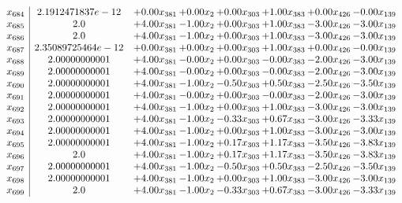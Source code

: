 \documentclass[8pt]{article}
\begin{document}
\[\begin{array}{c| c c@{\hskip 2pt} c@{\hskip 2pt} c@{\hskip 2pt} c@{\hskip 2pt} c@{\hskip 2pt} c@{\hskip 2pt} }
 x_{684}   &  2.1912471837e-12 & +  0.00 x_{381} & +  0.00 x_{2} & +  0.00 x_{303} & +  1.00 x_{383} & +  0.00 x_{426} & -0.00 x_{139}\\
 x_{685}   &  2.0 & +  4.00 x_{381} & -1.00 x_{2} & +  0.00 x_{303} & +  1.00 x_{383} & -3.00 x_{426} & -3.00 x_{139}\\
 x_{686}   &  2.0 & +  4.00 x_{381} & -1.00 x_{2} & +  0.00 x_{303} & +  1.00 x_{383} & -3.00 x_{426} & -3.00 x_{139}\\
 x_{687}   &  2.35089725464e-12 & +  0.00 x_{381} & +  0.00 x_{2} & +  0.00 x_{303} & +  1.00 x_{383} & +  0.00 x_{426} & -0.00 x_{139}\\
 x_{688}   &  2.00000000001 & +  4.00 x_{381} & -0.00 x_{2} & +  0.00 x_{303} & -0.00 x_{383} & -2.00 x_{426} & -3.00 x_{139}\\
 x_{689}   &  2.00000000001 & +  4.00 x_{381} & -0.00 x_{2} & +  0.00 x_{303} & -0.00 x_{383} & -2.00 x_{426} & -3.00 x_{139}\\
 x_{690}   &  2.00000000001 & +  4.00 x_{381} & -1.00 x_{2} & -0.50 x_{303} & +  0.50 x_{383} & -2.50 x_{426} & -3.50 x_{139}\\
 x_{691}   &  2.00000000001 & +  4.00 x_{381} & -0.00 x_{2} & +  0.00 x_{303} & -0.00 x_{383} & -2.00 x_{426} & -3.00 x_{139}\\
 x_{692}   &  2.00000000001 & +  4.00 x_{381} & -1.00 x_{2} & +  0.00 x_{303} & +  1.00 x_{383} & -3.00 x_{426} & -3.00 x_{139}\\
 x_{693}   &  2.00000000001 & +  4.00 x_{381} & -1.00 x_{2} & -0.33 x_{303} & +  0.67 x_{383} & -3.00 x_{426} & -3.33 x_{139}\\
 x_{694}   &  2.00000000001 & +  4.00 x_{381} & -1.00 x_{2} & +  0.00 x_{303} & +  1.00 x_{383} & -3.00 x_{426} & -3.00 x_{139}\\
 x_{695}   &  2.00000000001 & +  4.00 x_{381} & -1.00 x_{2} & +  0.17 x_{303} & +  1.17 x_{383} & -3.50 x_{426} & -3.83 x_{139}\\
 x_{696}   &  2.0 & +  4.00 x_{381} & -1.00 x_{2} & +  0.17 x_{303} & +  1.17 x_{383} & -3.50 x_{426} & -3.83 x_{139}\\
 x_{697}   &  2.00000000001 & +  4.00 x_{381} & -1.00 x_{2} & -0.50 x_{303} & +  0.50 x_{383} & -2.50 x_{426} & -3.50 x_{139}\\
 x_{698}   &  2.00000000001 & +  4.00 x_{381} & -1.00 x_{2} & +  0.00 x_{303} & +  1.00 x_{383} & -3.00 x_{426} & -3.00 x_{139}\\
 x_{699}   &  2.0 & +  4.00 x_{381} & -1.00 x_{2} & -0.33 x_{303} & +  0.67 x_{383} & -3.00 x_{426} & -3.33 x_{139}\\

\end{array}\]
\end{document}

